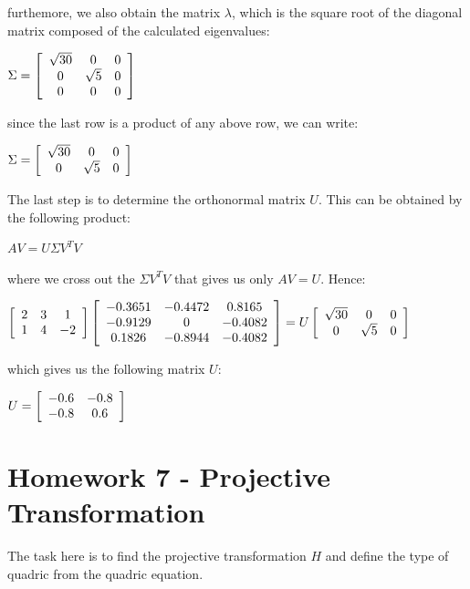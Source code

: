 \documentclass[]{article}
\begin{document}
furthemore, we also obtain the matrix $\lambda$, which is the square root of the diagonal matrix composed of the calculated eigenvalues: 

\centerline{ $\Sigma = \left[ {\begin{array}{*{20}c}
		\sqrt{30} & 0 & 0 \\
		0 & \sqrt{5} & 0 \\ 
		0 & 0 & 0   
		\end{array} } \right]$ 
}

since the last row is a product of any above row, we can write:

\centerline{ $\Sigma = \left[ {\begin{array}{*{20}c}
		\sqrt{30} & 0 & 0 \\
		0 & \sqrt{5} & 0   
		\end{array} } \right]$ 
}

The last step is to determine the orthonormal matrix $U$. This can be obtained by the following product:

\centerline {
	$AV = U \Sigma V^TV$
} 

where we cross out the $\Sigma V^TV$ that gives us only $AV = U$. Hence:

\centerline{ $\left[ {\begin{array}{*{20}c}
		2 & 3 & 1 \\
		1 & 4 & -2   
		\end{array} } \right] 
			\left[ {\begin{array}{*{20}c}
		-0.3651 & -0.4472 & 0.8165 \\
		-0.9129 & 0 & -0.4082 \\ 
		0.1826 & -0.8944 & -0.4082  
		\end{array} } \right] = U \left[ {\begin{array}{*{20}c}
		\sqrt{30} & 0 & 0 \\
		0 & \sqrt{5} & 0   
		\end{array} } \right]$ 
}

which gives us the following matrix $U$:

\centerline {
	$U = \left[ {\begin{array}{*{20}c}
		-0.6 & -0.8 \\
		-0.8 & 0.6   
		\end{array} } \right]$
}

\section{Homework 7 - Projective Transformation}  
The task here is to find the projective transformation $H$ and define the type of quadric from the quadric equation.
\end{document}
